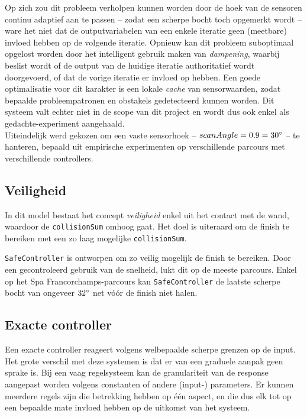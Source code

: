 \documentclass[10pt,a4paper]{article}
\begin{document}
			Op zich zou dit probleem verholpen kunnen worden door de hoek van de sensoren continu adaptief aan te passen -- zodat een scherpe bocht toch opgemerkt wordt -- ware het niet dat de outputvariabelen van een enkele iteratie geen (meetbare) invloed hebben op de volgende iteratie. Opnieuw kan dit probleem suboptimaal opgelost worden door het intelligent gebruik maken van \textit{dampening}, waarbij beslist wordt of de output van de huidige iteratie authoritatief wordt doorgevoerd, of dat de vorige iteratie er invloed op hebben. Een goede optimalisatie voor dit karakter is een lokale \textit{cache} van sensorwaarden, zodat bepaalde probleempatronen en obstakels gedetecteerd kunnen worden. Dit systeem valt echter niet in de scope van dit project en wordt dus ook enkel als gedachte-experiment aangehaald.\\

			Uiteindelijk werd gekozen om een vaste sensorhoek -- $scanAngle = 0.9 = 30 \degree$ -- te hanteren, bepaald uit empirische experimenten op verschillende parcours met verschillende controllers.

		\subsection{Veiligheid}
			In dit model bestaat het concept \textit{veiligheid} enkel uit het contact met de wand, waardoor de \texttt{collisionSum} omhoog gaat. Het doel is uiteraard om de finish te bereiken met een zo laag mogelijke \texttt{collisionSum}.

			\texttt{SafeController} is ontworpen om zo veilig mogelijk de finish te bereiken. Door een gecontroleerd gebruik van de snelheid, lukt dit op de meeste parcours. Enkel op het Spa Francorchamps-parcours kan \texttt{SafeController} de laatste scherpe bocht van ongeveer $32 \degree$ net v\'o\'or de finish niet halen.\\



		\subsection{Exacte controller}
			Een exacte controller reageert volgens welbepaalde scherpe grenzen op de input. Het grote verschil met deze systemen is dat er van een graduele aanpak geen sprake is. Bij een vaag regelsysteem kan de granulariteit van de response aangepast worden volgens constanten of andere (input-) parameters. Er kunnen meerdere regels zijn die betrekking hebben op \'e\'en aspect, en die dus elk tot op een bepaalde mate invloed hebben op de uitkomst van het systeem. \\
\end{document}
